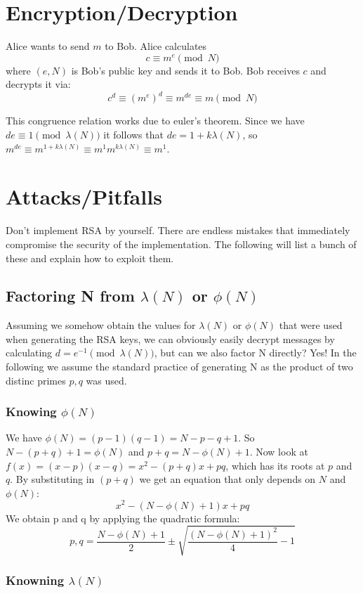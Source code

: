 \section{Encryption/Decryption}
Alice wants to send $m$ to Bob. Alice calculates
\[ c \equiv m^e \pmod{N} \]
where $(e,N)$ is Bob's public key and sends it to Bob. Bob receives $c$ and decrypts it via:
\[ c^d \equiv (m^e)^d \equiv m^{de} \equiv m \pmod{N} \]

This congruence relation works due to euler's theorem. Since we have $de \equiv 1 \pmod{\lambda(N)}$ it follows that $de = 1 + k\lambda(N)$, so $m^{de} \equiv m^{1 + k\lambda(N)} \equiv m^1m^{k\lambda(N)} \equiv m^1$.

\section{Attacks/Pitfalls}

Don't implement RSA by yourself. There are endless mistakes that immediately compromise the security of the implementation. The following will list a bunch of these and explain how to exploit them.

\subsection{Factoring N from $\lambda(N)$ or $\phi(N)$}

Assuming we somehow obtain the values for $\lambda(N)$ or $\phi(N)$ that were used when generating the RSA keys, we can obviously easily decrypt messages by calculating $d = e^{-1} \pmod{\lambda(N)}$, but can we also factor N directly? Yes! In the following we assume the standard practice of generating N as the product of two distinc primes $p,q$ was used.

\subsubsection{Knowing $\phi(N)$}

We have $\phi(N) = (p-1)(q-1) = N - p - q + 1$. So $N - (p + q) + 1 = \phi(N)$ and $p+q = N - \phi(N) + 1$. Now look at $f(x) = (x - p)(x - q) = x^2 - (p + q)x + pq$, which has its roots at $p$ and $q$. By substituting in $(p+q)$ we get an equation that only depends on $N$ and $\phi(N)$:
\[ x^2 - (N - \phi(N) + 1)x + pq \]
We obtain p and q by applying the quadratic formula:
\[ p,q = \frac{N - \phi(N) + 1}{2} \pm \sqrt{\frac{(N - \phi(N) + 1)^2}{4} - 1} \]

\subsubsection{Knowning $\lambda(N)$}

